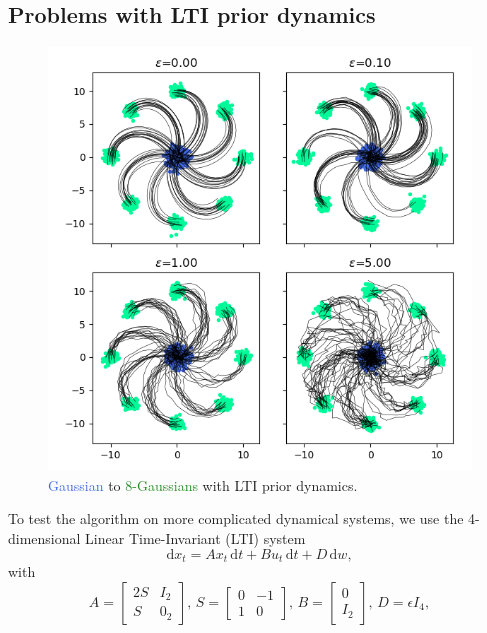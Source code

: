\documentclass[twoside]{article}
\renewcommand{\d}{\mathrm{d}}
\begin{document}
\subsection{Problems with LTI prior dynamics} \label{LTI_exps}
%
\begin{figure} 
    \centering
    \includegraphics[width=0.9\linewidth]{figures/4D_GMM.png}
    \caption{\textcolor{RoyalBlue}{Gaussian} to \textcolor{ForestGreen}{8-Gaussians}  with LTI prior dynamics.}
    \label{fig:GMM4D}
\end{figure}
%
To test the algorithm on more complicated dynamical systems, we use the 4-dimensional Linear Time-Invariant (LTI) system 
\begin{equation} \label{LTI}
    \d x_t = A x_t \, \d t + B u_t \, \d t + D \, \d w,
\end{equation}
with
\begin{equation*}
    A = \begin{bmatrix} 2S &  I_2 \\ S & 0_2 \end{bmatrix},\, S = \begin{bmatrix} 0 &  -1 \\ 1 & 0 \end{bmatrix}, \, B = \begin{bmatrix} 0 \\ I_2  \end{bmatrix}, \,  D = \epsilon I_4 ,
\end{equation*}
\end{document}
